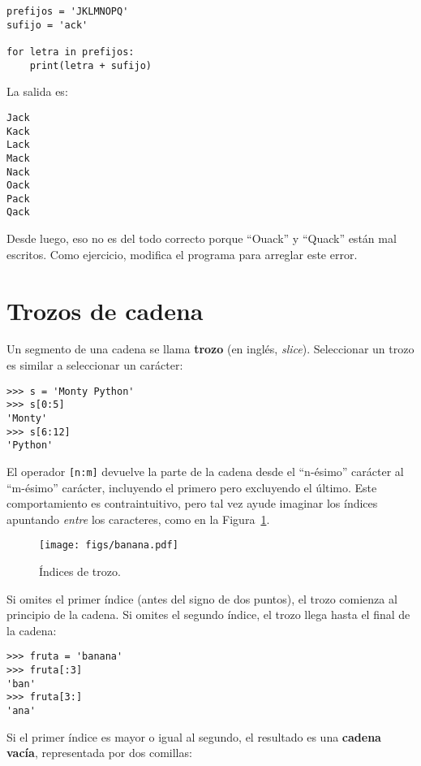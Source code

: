 \documentclass[10pt]{book}
\begin{document}
\begin{verbatim}
prefijos = 'JKLMNOPQ'
sufijo = 'ack'

for letra in prefijos:
    print(letra + sufijo)
\end{verbatim}
%
La salida es:

\begin{verbatim}
Jack
Kack
Lack
Mack
Nack
Oack
Pack
Qack
\end{verbatim}
%
Desde luego, eso no es del todo correcto porque ``Ouack'' y ``Quack'' están
mal escritos.  Como ejercicio, modifica el programa para arreglar este error.



\section{Trozos de cadena}
\label{slice}
  
  

Un segmento de una cadena se llama {\bf trozo} (en inglés, {\em slice}).  Seleccionar un trozo es
similar a seleccionar un carácter:

\begin{verbatim}
>>> s = 'Monty Python'
>>> s[0:5]
'Monty'
>>> s[6:12]
'Python'
\end{verbatim}
%
El operador {\tt [n:m]} devuelve la parte de la cadena desde el 
``n-ésimo'' carácter al ``m-ésimo'' carácter, incluyendo el primero pero
excluyendo el último.  Este comportamiento es contraintuitivo, pero tal vez
ayude imaginar los índices apuntando {\em entre} los
caracteres, como en la Figura~\ref{fig.banana}.

\begin{figure}
\centerline
{\texttt{[image: figs/banana.pdf]}}
\caption{Índices de trozo.}
\label{fig.banana}
\end{figure}

Si omites el primer índice (antes del signo de dos puntos), el trozo comienza al
principio de la cadena.  Si omites el segundo índice, el trozo
llega hasta el final de la cadena:

\begin{verbatim}
>>> fruta = 'banana'
>>> fruta[:3]
'ban'
>>> fruta[3:]
'ana'
\end{verbatim}
%
Si el primer índice es mayor o igual al segundo, el resultado
es una {\bf cadena vacía}, representada por dos comillas:
\end{document}
